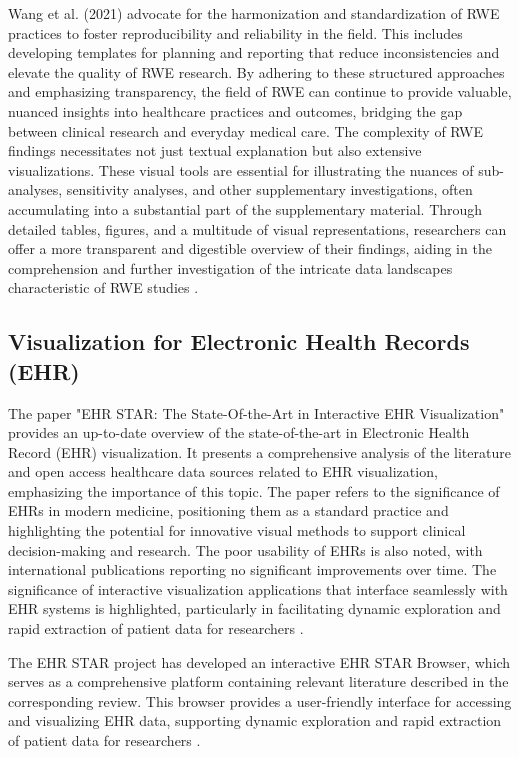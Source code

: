 Wang et al. (2021) advocate for the harmonization and standardization of RWE practices to foster reproducibility and reliability in the field. This includes developing templates for planning and reporting that reduce inconsistencies and elevate the quality of RWE research. By adhering to these structured approaches and emphasizing transparency, the field of RWE can continue to provide valuable, nuanced insights into healthcare practices and outcomes, bridging the gap between clinical research and everyday medical care. The complexity of RWE findings necessitates not just textual explanation but also extensive visualizations. These visual tools are essential for illustrating the nuances of sub-analyses, sensitivity analyses, and other supplementary investigations, often accumulating into a substantial part of the supplementary material. Through detailed tables, figures, and a multitude of visual representations, researchers can offer a more transparent and digestible overview of their findings, aiding in the comprehension and further investigation of the intricate data landscapes characteristic of RWE studies \cite{soa5}.

\subsection{Visualization for Electronic Health Records (EHR)}\label{visualization-for-electronic-health-records-ehr}

The paper "EHR STAR: The State-Of-the-Art in Interactive EHR Visualization" provides an up-to-date overview of the state-of-the-art in Electronic Health Record (EHR) visualization. It presents a comprehensive analysis of the literature and open access healthcare data sources related to EHR visualization, emphasizing the importance of this topic. The paper refers to the significance of EHRs in modern medicine, positioning them as a standard practice and highlighting the potential for innovative visual methods to support clinical decision-making and research. The poor usability of EHRs is also noted, with international publications reporting no significant improvements over time. The significance of interactive visualization applications that interface seamlessly with EHR systems is highlighted, particularly in facilitating dynamic exploration and rapid extraction of patient data for researchers \cite{soa8}.

The EHR STAR project has developed an interactive EHR STAR Browser, which serves as a comprehensive platform containing relevant literature described in the corresponding review. This browser provides a user-friendly interface for accessing and visualizing EHR data, supporting dynamic exploration and rapid extraction of patient data for researchers \cite{soa8}.



